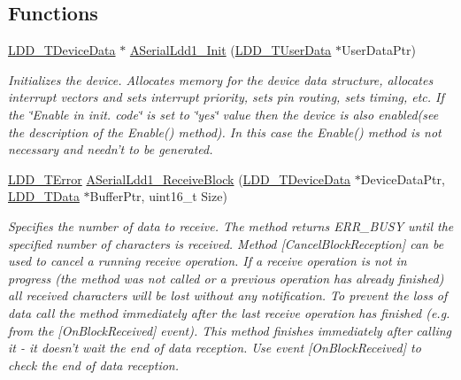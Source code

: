 \subsection*{Functions}
\begin{DoxyCompactItemize}
\item 
\hyperlink{group___p_e___types__module_gac5cf1362f1f0e3a2ce71b1bf2276d091}{L\-D\-D\-\_\-\-T\-Device\-Data} $\ast$ \hyperlink{group___a_serial_ldd1__module_ga72a2988ac3b4e592eb9dd9c9cf0db38f}{A\-Serial\-Ldd1\-\_\-\-Init} (\hyperlink{group___p_e___types__module_ga0b66a73f87238a782318aa0be7578e35}{L\-D\-D\-\_\-\-T\-User\-Data} $\ast$User\-Data\-Ptr)
\begin{DoxyCompactList}\small\item\em Initializes the device. Allocates memory for the device data structure, allocates interrupt vectors and sets interrupt priority, sets pin routing, sets timing, etc. If the \char`\"{}\-Enable
    in init. code\char`\"{} is set to \char`\"{}yes\char`\"{} value then the device is also enabled(see the description of the Enable() method). In this case the Enable() method is not necessary and needn't to be generated. \end{DoxyCompactList}\item 
\hyperlink{group___p_e___types__module_ga24c2b045fd04e79e85f261ce4df35588}{L\-D\-D\-\_\-\-T\-Error} \hyperlink{group___a_serial_ldd1__module_gad445e8cc518c6e88fc212bd6d4e06490}{A\-Serial\-Ldd1\-\_\-\-Receive\-Block} (\hyperlink{group___p_e___types__module_gac5cf1362f1f0e3a2ce71b1bf2276d091}{L\-D\-D\-\_\-\-T\-Device\-Data} $\ast$Device\-Data\-Ptr, \hyperlink{group___p_e___types__module_gade8ef9401405bd941b6da738b807f980}{L\-D\-D\-\_\-\-T\-Data} $\ast$Buffer\-Ptr, uint16\-\_\-t Size)
\begin{DoxyCompactList}\small\item\em Specifies the number of data to receive. The method returns E\-R\-R\-\_\-\-B\-U\-S\-Y until the specified number of characters is received. Method \mbox{[}Cancel\-Block\-Reception\mbox{]} can be used to cancel a running receive operation. If a receive operation is not in progress (the method was not called or a previous operation has already finished) all received characters will be lost without any notification. To prevent the loss of data call the method immediately after the last receive operation has finished (e.\-g. from the \mbox{[}On\-Block\-Received\mbox{]} event). This method finishes immediately after calling it -\/ it doesn't wait the end of data reception. Use event \mbox{[}On\-Block\-Received\mbox{]} to check the end of data reception. \end{DoxyCompactList}\item 

\end{DoxyCompactItemize}
